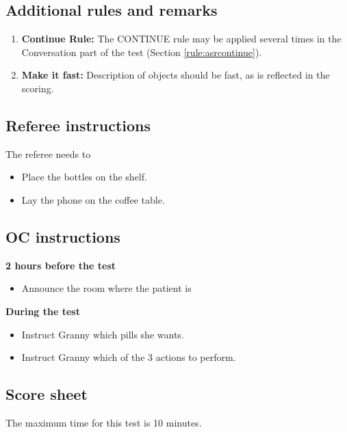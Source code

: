 \subsection{Additional rules and remarks}
\begin{enumerate}
\item \textbf{Continue Rule:} The CONTINUE rule may be applied several times in the Conversation part of the test (Section \ref{rule:asrcontinue}).
\item \textbf{Make it fast:} Description of objects should be fast, as is reflected in the scoring.
\end{enumerate}

\subsection{Referee instructions}

The referee needs to
\begin{itemize}
\item Place the bottles on the shelf.
\item Lay the phone on the coffee table.
\end{itemize}

\subsection{OC instructions}

\textbf{2 hours before the test}
\begin{itemize}
\item Announce the room where the patient is
\end{itemize}
\textbf{During the test}
\begin{itemize}
\item Instruct Granny which pills she wants.
\item Instruct Granny which of the 3 actions to perform.
\end{itemize}

\subsection{Score sheet}

The maximum time for this test is 10 minutes.

